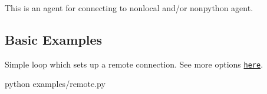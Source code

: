 This is an agent for connecting to nonlocal and/or nonpython agent.

\subsection*{Basic Examples}

Simple loop which sets up a remote connection. See more options \href{https://github.com/facebookresearch/ParlAI/blob/master/examples/remote.py}{\tt here}. 
\begin{DoxyCode}
python examples/remote.py
\end{DoxyCode}
 